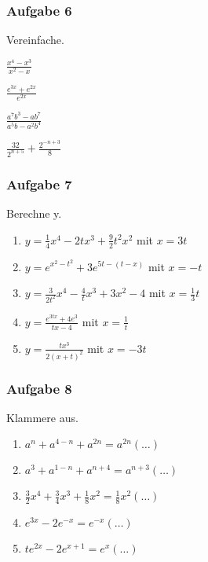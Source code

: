 \subsubsection{Aufgabe 6}
Vereinfache.
\begin{enumerate}
\begin{multicols}{2}
	\item \quad $ \frac{x^4-x^3}{x^2-x} $
	\item \quad $ \frac{e^{3x}+e^{2x}}{e^{2x}} $
	\item \quad $ \frac{a^7b^3-ab^7}{a^5b-a^2b^4} $
	\item \quad $ \frac{32}{2^{n+5}} + \frac{2^{-n+3}}{8} $
\end{multicols}
\end{enumerate}

\subsubsection{Aufgabe 7}
Berechne y.
\begin{enumerate}
	\item \quad $ y = \frac{1}{4}x^4-2tx^3+\frac{9}{2}t^2x^2 $ mit $ x = 3t $
	\item \quad $ y = e^{x^2-t^2}+3e^{5t-(t-x)} $ mit $ x = -t $
	\item \quad $ y = \frac{3}{2t^2}x^4 - \frac{4}{t}x^3 + 3x^2 - 4 $ mit $ x = \frac{1}{3}t $
	\item \quad $ y = \frac{e^{3tx}+4e^3}{tx-4} $ mit $ x = \frac{1}{t} $
	\item \quad $ y = \frac{tx^3}{2(x+t)^2} $ mit $x = -3t $ 
\end{enumerate}

\subsubsection{Aufgabe 8}
Klammere aus.
\begin{enumerate}
	\item \quad $ a^n+a^{4-n}+a^{2n} = a^{2n}(\ldots) $
	\item \quad $ a^3 + a^{1-n} + a^{n+4} = a^{n+3}(\ldots) $
	\item \quad $ \frac{3}{2}x^4+\frac{3}{4}x^3+\frac{1}{8}x^2 = \frac{1}{8}x^2(\ldots) $
	\item \quad $ e^{3x}-2e^{-x} = e^{-x}(\ldots) $
	\item \quad $ te^{2x}-2e^{x+1} = e^x(\ldots) $
\end{enumerate}

